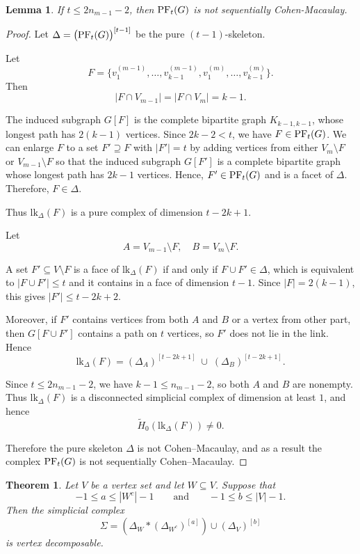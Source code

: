 \documentclass[12pt,reqno]{amsart}
\newtheorem{lemma}[lemma]{Lemma}
\newtheorem{theorem}[theorem]{Theorem}
\theoremstyle{definition}
\newcommand{\lk}{{\mathrm{lk}}}
\newcommand{\PF}{{\rm PF}}
\begin{document}
\begin{lemma}\label{lem: SCM for CMG}
    If $t\le 2n_{m-1}-2$, then $\PF_t(G)$ is not sequentially Cohen-Macaulay.
\end{lemma}
\begin{proof}
Let $\Delta = \bigl(\PF_t(G)\bigr)^{[t-1]}$ be the pure $(t-1)$-skeleton. %

\medskip
Let 
\[
F=\{v^{(m-1)}_1,\ldots,v^{(m-1)}_{k-1}, v^{(m)}_1,\ldots,v^{(m)}_{k-1}\}.
\]
Then
\[  |F\cap V_{m-1}| = |F\cap V_m| = k-1. \]

The induced subgraph $G[F]$ is the complete bipartite graph $K_{k-1,k-1}$, whose longest path has $2(k-1)$ vertices. Since $2k-2<t$, we have $F\in\PF_t(G)$. We can enlarge $F$ to a set $F'\supseteq F$ with $|F'|=t$ by adding vertices from either $V_m\setminus F$ or $V_{m-1}\setminus F$ so that the induced subgraph $G[F']$ is a complete bipartite graph whose longest path has $2k-1$ vertices. Hence, $F'\in\PF_t(G)$ and is a facet of $\Delta$. Therefore, $F\in\Delta$.

Thus $\lk_{\Delta}(F)$ is a pure complex of dimension $t-2k+1$. 

Let
\[
A = V_{m-1} \setminus F, \quad B = V_m \setminus F.
\]

A set $F' \subseteq V \setminus F$ is a face of $\mathrm{lk}_\Delta(F)$ if and only if
$F \cup F' \in \Delta$, which is equivalent to $|F \cup F'| \le t$ and it contains in a face of dimension $t-1$. 
Since
$|F| = 2(k-1)$, this gives $|F'| \le t - 2k + 2$.

Moreover, if $F'$ contains vertices from both $A$ and $B$ or a vertex from other part, then $G[F \cup F']$
contains a path on $t$ vertices, so $F'$ does not lie in the link. Hence
\[
\mathrm{lk}_\Delta(F)
=
(\Delta_A)^{[t-2k+1]} \;\cup\; (\Delta_B)^{[t-2k+1]}.
\]

Since $t \le 2n_{m-1} - 2$, we have $k-1 \le n_{m-1} - 2$, so both $A$ and $B$
are nonempty. Thus $\mathrm{lk}_\Delta(F)$ is a disconnected simplicial complex
of dimension at least $1$, and hence
\[
\widetilde{H}_0(\mathrm{lk}_\Delta(F)) \neq 0.
\]

Therefore the pure skeleton $\Delta$ is not Cohen–Macaulay, and as a result the complex $\PF_t(G)$ is not
sequentially Cohen–Macaulay.
\end{proof}


\begin{theorem}\label{them: General V.D}
Let $V$ be a vertex set and let $W \subseteq V$. Suppose that
\[
-1 \le a \le |W^{c}|-1
\qquad \text{and} \qquad
-1 \le b \le |V|-1.
\]
Then the simplicial complex
\[
\Sigma
=
\left(\Delta_{W} * (\Delta_{W^{c}})^{[a]} \right)
\cup
(\Delta_{V})^{[b]}
\]
is vertex decomposable.
\end{theorem}
\end{document}
